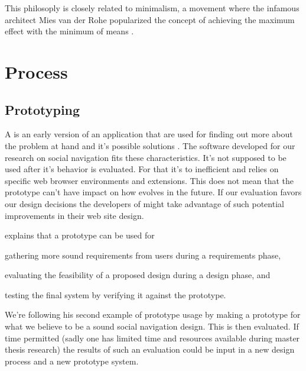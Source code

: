 This philosoply is closely related to minimalism, a movement where the
infamous architect Mies van der Rohe popularized the concept of
\dash{}achieving the maximum effect with the minimum of
means \citep{whitman69}.


%
%
%
%

\section{Process}

\subsection{Prototyping}

A  is an early version of an application that are used for
finding out more about the problem at hand and it's possible solutions
\citep[]{sommerville06}.
The software developed for our research on social navigation fits these
characteristics. It's not supposed to be used after it's behavior is
evaluated. For that it's to inefficient and relies on specific web browser
environments and extensions. This does not mean that the prototype can't have
impact on how \urort{} evolves in the future. If our evaluation favors our
design decisions the developers of \urort{} might take advantage of such
potential improvements in their web site design.

\citet[]{sommerville06} explains that a prototype can be used for
\begin{inparaenum}[(i)]
  \item gathering more sound requirements from users during a
    requirements phase,
  \item evaluating the feasibility of a proposed design during a
    design phase, and
  \item testing the final system by verifying it against the prototype.
\end{inparaenum}
We're following his second example of prototype usage by making a prototype
for what we believe to be a sound social navigation design. This is then
evaluated. If time permitted (sadly one has limited time and resources
available during master thesis research) the results of such an evaluation
could be input in a new design process and a new prototype system.

